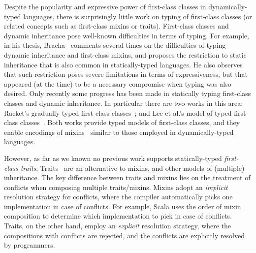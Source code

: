 Despite the popularity and expressive power of first-class classes in dynamically-typed
languages, there is surprisingly little work on typing of first-class
classes (or related concepts such as first-class mixins or traits).
First-class classes and dynamic inheritance pose well-known
difficulties in terms of typing. For example, in his thesis,
Bracha~\cite{bracha1992programming} comments several times on the difficulties of typing
dynamic inheritance and first-class mixins, and proposes the
restriction to static inheritance that is also common in
statically-typed languages. He also observes that such restriction
poses severe limitations in terms of expressiveness, but that appeared
(at the time)
to be a necessary compromise when typing was also desired.
Only recently some progress has been made in statically typing 
first-class classes and dynamic inheritance. In particular there are
two works in this area: Racket's gradually
typed first-class classes~\cite{DBLP:conf/oopsla/TakikawaSDTF12}; and Lee et al.'s model of
typed first-class classes~\cite{DBLP:conf/ecoop/LeeASP15}. Both works provide typed models of
first-class classes, and they enable encodings of mixins~\cite{bracha1990mixin}
similar to those employed in dynamically-typed languages.

However, as far as we known no previous work supports statically-typed
\emph{first-class traits}. Traits~\cite{scharli2003traits} are an alternative to
mixins, and other models of (multiple) inheritance. The key difference between traits and mixins lies on the
treatment of conflicts when
composing multiple traits/mixins. Mixins adopt an
\emph{implicit} resolution strategy for conflicts, where the 
compiler automatically picks one implementation in case of conflicts.
For example, Scala uses the order of mixin composition to determine which 
implementation to pick in case of conflicts.
Traits, on the other hand, employ an \emph{explicit} resolution
strategy, where the compositions with conflicts are rejected, and the
conflicts are explicitly resolved by programmers. 

